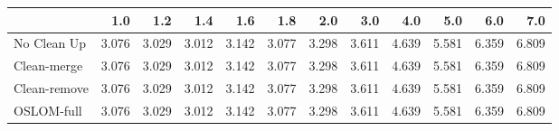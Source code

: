 \begin{tabular}{lrrrrrrrrrrr}
\toprule
{} &   1.0 &   1.2 &   1.4 &   1.6 &   1.8 &   2.0 &   3.0 &   4.0 &   5.0 &   6.0 &   7.0 \\
\midrule
No Clean Up  & 3.076 & 3.029 & 3.012 & 3.142 & 3.077 & 3.298 & 3.611 & 4.639 & 5.581 & 6.359 & 6.809 \\
Clean-merge  & 3.076 & 3.029 & 3.012 & 3.142 & 3.077 & 3.298 & 3.611 & 4.639 & 5.581 & 6.359 & 6.809 \\
Clean-remove & 3.076 & 3.029 & 3.012 & 3.142 & 3.077 & 3.298 & 3.611 & 4.639 & 5.581 & 6.359 & 6.809 \\
OSLOM-full   & 3.076 & 3.029 & 3.012 & 3.142 & 3.077 & 3.298 & 3.611 & 4.639 & 5.581 & 6.359 & 6.809 \\
\bottomrule
\end{tabular}
